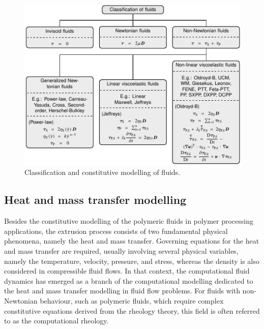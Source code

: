 \begin{figure}[!htb]
\centering
\includegraphics[width=\textwidth]{chap1/include/tikz/classification_of_fluids.pdf}
\caption{Classification and constitutive modelling of fluids.}
\label{chap1:fig:mathematical_modelling_classification_of_fluids}
\end{figure}

\subsection{Heat and mass transfer modelling}
\label{chap1:subsec:computational_modelling_mass_transfer_modelling}

Besides the constitutive modelling of the polymeric fluids in polymer processing applications, the extrusion process consists of two fundamental physical phenomena, namely the heat and mass transfer.
Governing equations for the heat and mass transfer are required, usually involving several physical variables, namely the temperature, velocity, pressure, and stress, whereas the density is also considered in compressible fluid flows.
In that context, the computational fluid dynamics has emerged as a branch of the computational modelling dedicated to the heat and mass transfer modelling in fluid flow problems.
For fluids with non-Newtonian behaviour, such as polymeric fluids, which require complex constitutive equations derived from the rheology theory, this field is often referred to as the computational rheology.

